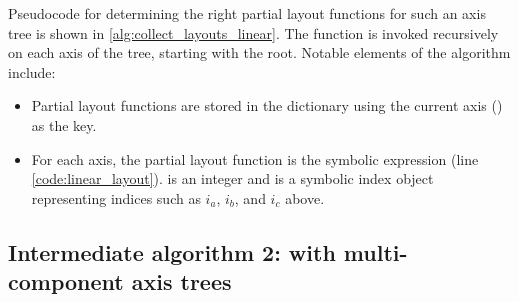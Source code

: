 \documentclass[thesis]{subfiles}
\begin{document}
Pseudocode for determining the right partial layout functions for such an axis tree is shown in \cref{alg:collect_layouts_linear}.
The function  is invoked recursively on each axis of the tree, starting with the root.
Notable elements of the algorithm include:

\begin{itemize}
  \item
    Partial layout functions are stored in the  dictionary using the current axis () as the key.

  \item
    For each axis, the partial layout function is the symbolic expression  (line \ref{code:linear_layout}).
     is an integer and  is a symbolic index object representing indices such as $i_a$, $i_b$, and $i_c$ above.
\end{itemize}

\subsection{Intermediate algorithm 2: with multi-component axis trees}
\label{sec:layout_alg_multi_component}
\end{document}
